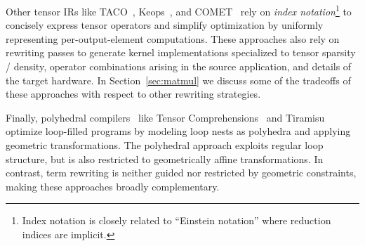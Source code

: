 Other tensor IRs like
  TACO~\cite{taco}, Keops~\cite{keops},
  and COMET~\cite{tian2021highperformance}
  rely on \textit{index notation}\footnote{
    Index notation is closely related to
    ``Einstein notation'' where reduction
    indices are implicit.}
  to concisely express tensor operators
  and simplify optimization by
  uniformly representing
  per-output-element computations.
These approaches also rely on
  rewriting passes to generate
  kernel implementations specialized to
  tensor sparsity / density,
  operator combinations arising in
  the source application, and
  details of the target hardware.
In Section~\ref{sec:matmul} we discuss
  some of the tradeoffs of these approaches
  with respect to other rewriting strategies.
 
Finally, polyhedral compilers~\cite{polyhedral-survey}
  like Tensor Comprehensions~\cite{vasilache2018tensor}
  and Tiramisu~\cite{tiramisu}
  optimize loop-filled programs
  by modeling loop nests as polyhedra
  and applying geometric transformations.
The polyhedral approach exploits
  regular loop structure,
  but is also restricted
  to geometrically affine transformations.
In contrast, term rewriting is
  neither guided nor restricted by
  geometric constraints, making
  these approaches broadly complementary.




